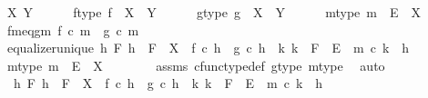 \begin{isabellebody}
\ X{\isacharprime}{\kern0pt}\ Y{\isacharprime}{\kern0pt}\isanewline
\ \ \ \ \isamarkupfalse%
\ f{\isacharunderscore}{\kern0pt}type{}{\isacharcolon}{\kern0pt}\ {\isachardoublequoteopen}f\ {\isacharcolon}{\kern0pt}\ X{\isacharprime}{\kern0pt}\ {\isasymrightarrow}\ Y{\isacharprime}{\kern0pt}{\isachardoublequoteclose}\isanewline
\ \ \ \ \isamarkupfalse%
\ g{\isacharunderscore}{\kern0pt}type{}{\isacharcolon}{\kern0pt}\ {\isachardoublequoteopen}g\ {\isacharcolon}{\kern0pt}\ X{\isacharprime}{\kern0pt}\ {\isasymrightarrow}\ Y{\isacharprime}{\kern0pt}{\isachardoublequoteclose}\isanewline
\ \ \ \ \isamarkupfalse%
\ m{\isacharunderscore}{\kern0pt}type{\isacharcolon}{\kern0pt}\ {\isachardoublequoteopen}m\ {\isacharcolon}{\kern0pt}\ E\ {\isasymrightarrow}\ X{\isacharprime}{\kern0pt}{\isachardoublequoteclose}\isanewline
\ \ \ \ \isamarkupfalse%
\ fm{\isacharunderscore}{\kern0pt}eq{\isacharunderscore}{\kern0pt}gm{\isacharcolon}{\kern0pt}\ {\isachardoublequoteopen}f\ {\isasymcirc}\isactrlsub c\ m\ {\isacharequal}{\kern0pt}\ g\ {\isasymcirc}\isactrlsub c\ m{\isachardoublequoteclose}\isanewline
\ \ \ \ \isamarkupfalse%
\ equalizer{\isacharunderscore}{\kern0pt}unique{\isacharcolon}{\kern0pt}\ {\isachardoublequoteopen}{\isasymforall}h\ F{\isachardot}{\kern0pt}\ h\ {\isacharcolon}{\kern0pt}\ F\ {\isasymrightarrow}\ X{\isacharprime}{\kern0pt}\ {\isasymand}\ f\ {\isasymcirc}\isactrlsub c\ h\ {\isacharequal}{\kern0pt}\ g\ {\isasymcirc}\isactrlsub c\ h\ {\isasymlongrightarrow}\ {\isacharparenleft}{\kern0pt}{\isasymexists}{\isacharbang}{\kern0pt}k{\isachardot}{\kern0pt}\ k\ {\isacharcolon}{\kern0pt}\ F\ {\isasymrightarrow}\ E\ {\isasymand}\ m\ {\isasymcirc}\isactrlsub c\ k\ {\isacharequal}{\kern0pt}\ h{\isacharparenright}{\kern0pt}{\isachardoublequoteclose}\isanewline
\isanewline
\ \ \ \ \isamarkupfalse%
\ m{\isacharunderscore}{\kern0pt}type{}{\isacharcolon}{\kern0pt}\ {\isachardoublequoteopen}m\ {\isacharcolon}{\kern0pt}\ E\ {\isasymrightarrow}\ X{\isachardoublequoteclose}\isanewline
\ \ \ \ \ \ \isamarkupfalse%
\ assms{\isacharparenleft}{\kern0pt}{}{\isacharparenright}{\kern0pt}\ cfunc{\isacharunderscore}{\kern0pt}type{\isacharunderscore}{\kern0pt}def\ g{\isacharunderscore}{\kern0pt}type{}\ m{\isacharunderscore}{\kern0pt}type\ \isamarkupfalse%
\ auto\isanewline
\isanewline
\ \ \ \ \isamarkupfalse%
\ {\isachardoublequoteopen}{\isasymAnd}\ h\ F{\isachardot}{\kern0pt}\ h\ {\isacharcolon}{\kern0pt}\ F\ {\isasymrightarrow}\ X\ {\isasymLongrightarrow}\ f\ {\isasymcirc}\isactrlsub c\ h\ {\isacharequal}{\kern0pt}\ g\ {\isasymcirc}\isactrlsub c\ h\ {\isasymLongrightarrow}\ {\isasymexists}k{\isachardot}{\kern0pt}\ k\ {\isacharcolon}{\kern0pt}\ F\ {\isasymrightarrow}\ E\ {\isasymand}\ m\ {\isasymcirc}\isactrlsub c\ k\ {\isacharequal}{\kern0pt}\ h{\isachardoublequoteclose}\isanewline

\end{isabellebody}
